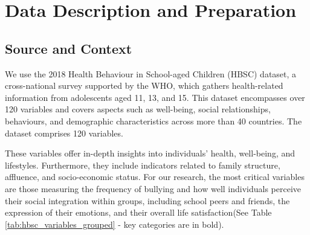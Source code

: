\documentclass[main.tex]{subfiles}
\begin{document}
\section{Data Description and Preparation}

\subsection{Source and Context}
We use the 2018 Health Behaviour in School-aged Children (HBSC) dataset, a cross-national survey supported by the WHO, which gathers health-related information from adolescents aged 11, 13, and 15. This dataset encompasses over 120 variables and covers aspects such as well-being, social relationships, behaviours, and demographic characteristics across more than 40 countries. The dataset comprises 120 variables.

These variables offer in-depth insights into individuals' health, well-being, and lifestyles. Furthermore, they include indicators related to family structure, affluence, and socio-economic status. For our research, the most critical variables are those measuring the frequency of bullying and how well individuals perceive their social integration within groups, including school peers and friends, the expression of their emotions, and their overall life satisfaction(See Table \ref{tab:hbsc_variables_grouped}  - key categories are in bold).
\end{document}
